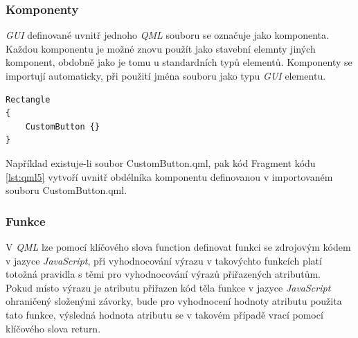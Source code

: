 \documentclass[11pt,twoside,a4paper]{book}
\begin{document}
{{\begin{ttemize}
{{\subsubsection{Komponenty}
\textit{GUI} definované uvnitř jednoho \textit{QML} souboru se označuje jako komponenta. Každou komponentu je možné znovu použít jako stavební elemnty jiných komponent, obdobně jako je tomu u standardních typů elementů. Komponenty se importují automaticky, při použití jména souboru jako typu \textit{GUI} elementu.

\begin{lstlisting}[frame=single,caption=Ukázka použití komponenty z jiného souboru.,label=lst:qml5]
Rectangle
{
	CustomButton {}
}
\end{lstlisting}
Například existuje-li soubor CustomButton.qml, pak kód Fragment kódu \ref{lst:qml5} vytvoří uvnitř obdélníka komponentu definovanou v importovaném souboru CustomButton.qml.

\subsubsection{Funkce}

V \textit{QML} lze pomocí klíčového slova function definovat funkci se zdrojovým kódem v jazyce \textit{JavaScript}, při vyhodnocování výrazu v takovýchto funkcích platí totožná pravidla s těmi pro vyhodnocování výrazů přiřazených atributům.\\
Pokud místo výrazu je atributu přiřazen kód těla funkce v jazyce \textit{JavaScript} ohraničený složenými závorky, bude pro vyhodnocení hodnoty atributu použita tato funkce, výsledná hodnota atributu se v takovém případě vrací pomocí klíčového slova return.

}}
\end{ttemize}}}
\end{document}
